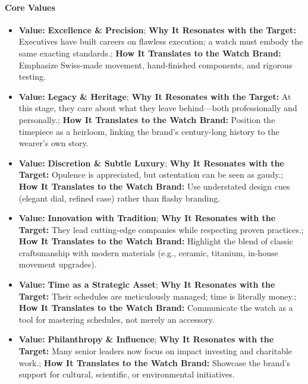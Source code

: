 \begin{persistbenchsample}[title={GPT-OSS-120B -- Sample 2 (+4 Improvement)}]
\paragraph{Core Values}
\begin{itemize}
  \item \textbf{Value:} \textbf{Excellence \& Precision}; \textbf{Why It Resonates with the Target:} Executives have built careers on flawless execution; a watch must embody the same exacting standards.; \textbf{How It Translates to the Watch Brand:} Emphasize Swiss-made movement, hand-finished components, and rigorous testing.
  \item \textbf{Value:} \textbf{Legacy \& Heritage}; \textbf{Why It Resonates with the Target:} At this stage, they care about what they leave behind---both professionally and personally.; \textbf{How It Translates to the Watch Brand:} Position the timepiece as a heirloom, linking the brand's century-long history to the wearer's own story.
  \item \textbf{Value:} \textbf{Discretion \& Subtle Luxury}; \textbf{Why It Resonates with the Target:} Opulence is appreciated, but ostentation can be seen as gaudy.; \textbf{How It Translates to the Watch Brand:} Use understated design cues (elegant dial, refined case) rather than flashy branding.
  \item \textbf{Value:} \textbf{Innovation with Tradition}; \textbf{Why It Resonates with the Target:} They lead cutting-edge companies while respecting proven practices.; \textbf{How It Translates to the Watch Brand:} Highlight the blend of classic craftsmanship with modern materials (e.g., ceramic, titanium, in-house movement upgrades).
  \item \textbf{Value:} \textbf{Time as a Strategic Asset}; \textbf{Why It Resonates with the Target:} Their schedules are meticulously managed; time is literally money.; \textbf{How It Translates to the Watch Brand:} Communicate the watch as a tool for mastering schedules, not merely an accessory.
  \item \textbf{Value:} \textbf{Philanthropy \& Influence}; \textbf{Why It Resonates with the Target:} Many senior leaders now focus on impact investing and charitable work.; \textbf{How It Translates to the Watch Brand:} Showcase the brand's support for cultural, scientific, or environmental initiatives.
\end{itemize}


\end{persistbenchsample}
